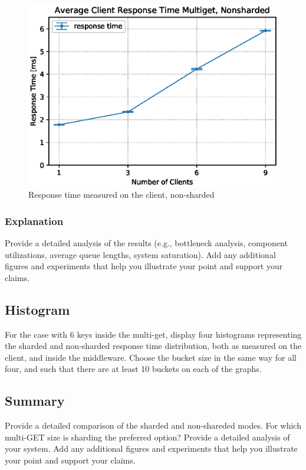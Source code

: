 \documentclass[11pt,a4paper]{article}
\begin{document}
\begin{figure}
    \centering
    \includegraphics[width=0.7\linewidth]{plots/5b_latencyMemtier.eps}
    \caption{Response time measured on the client, non-sharded}
    \label{fig:5-2-responsetime}
\end{figure}

\subsubsection{Explanation}

Provide a detailed analysis of the results (e.g., bottleneck analysis, component utilizations, average queue lengths, system saturation). Add any additional figures and experiments that help you illustrate your point and support your claims.

\subsection{Histogram}

For the case with 6 keys inside the multi-get, display four histograms representing the sharded and non-sharded response time distribution, both as measured on the client, and inside the middleware. Choose the bucket size in the same way for all four, and such that there are at least 10 buckets on each of the graphs.

\subsection{Summary}

Provide a detailed comparison of the sharded and non-shareded modes. For which multi-GET size is sharding the preferred option? Provide a detailed analysis of your system. Add any additional figures and experiments that help you illustrate your point and support your claims.
\end{document}
